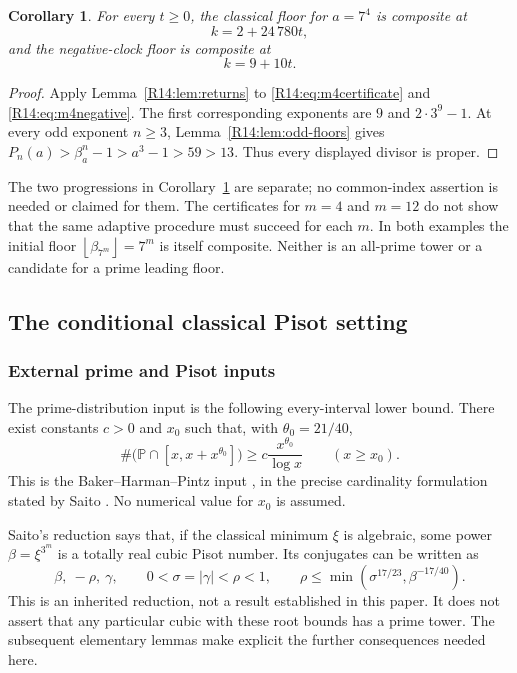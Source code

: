 \documentclass[11pt,a4paper]{article}
\newtheorem{corollary}[theorem]{Corollary}\newtheorem{mainthm}[theorem]{Theorem}
\theoremstyle{definition}\newtheorem{definition}[theorem]{Definition}
\theoremstyle{remark}\newtheorem{remark}[theorem]{Remark}
\newcommand{\PP}{\mathbb P}\newcommand{\W}{\mathcal W}\newcommand{\SaitoL}{\mathcal S}
\newcommand{\floor}[1]{\left\lfloor#1\right\rfloor}
\begin{document}
\begin{corollary}\label{R14:cor:m4}
For every $t\ge0$, the classical floor for $a=7^4$ is composite at
\[
 k=2+24\,780t,
\]
and the negative-clock floor is composite at
\[
 k=9+10t.
\]
\end{corollary}

\begin{proof}
Apply Lemma~\ref{R14:lem:returns} to
\eqref{R14:eq:m4certificate} and \eqref{R14:eq:m4negative}. The first
corresponding exponents are $9$ and $2\cdot3^9-1$. At every odd
exponent $n\ge3$, Lemma~\ref{R14:lem:odd-floors} gives
$P_n(a)>\beta_a^n-1>a^3-1>59>13$. Thus every displayed divisor
is proper.
\end{proof}

The two progressions in Corollary~\ref{R14:cor:m4} are separate; no
common-index assertion is needed or claimed for them. The
certificates for $m=4$ and $m=12$ do not show that the same adaptive
procedure must succeed for each $m$. In both examples the initial
floor $\floor{\beta_{7^m}}=7^m$ is itself composite. Neither is an
all-prime tower or a candidate for a prime leading floor.

\subsection{The conditional classical Pisot setting}

\subsubsection{External prime and Pisot inputs}

The prime-distribution input is the following every-interval lower
bound. There exist constants $c>0$ and $x_0$ such that, with
$\theta_0=21/40$,
\begin{equation}\label{R14:eq:bhp}
 \#\bigl(\PP\cap[x,x+x^{\theta_0}]\bigr)
 \ge c\frac{x^{\theta_0}}{\log x}\qquad(x\ge x_0).
\end{equation}
This is the Baker--Harman--Pintz input \cite{BHP}, in the precise
cardinality formulation stated by Saito
\cite[Theorem 1.6]{Saito}. No numerical value for $x_0$ is assumed.

Saito's reduction \cite[Theorem 1.7]{Saito} says that, if the
classical minimum $\xi$ is algebraic, some power
$\beta=\xi^{3^m}$ is a totally real cubic Pisot number. Its
conjugates can be written as
\begin{equation}\label{R14:eq:saito-shape}
 \beta,\ -\rho,\ \gamma,\qquad
 0<\sigma=|\gamma|<\rho<1,\qquad
 \rho\le\min(\sigma^{17/23},\beta^{-17/40}).
\end{equation}
This is an inherited reduction, not a result established in this
paper. It does not assert that any particular cubic with these
root bounds has a prime tower. The subsequent elementary lemmas
make explicit the further consequences needed here.
\end{document}

